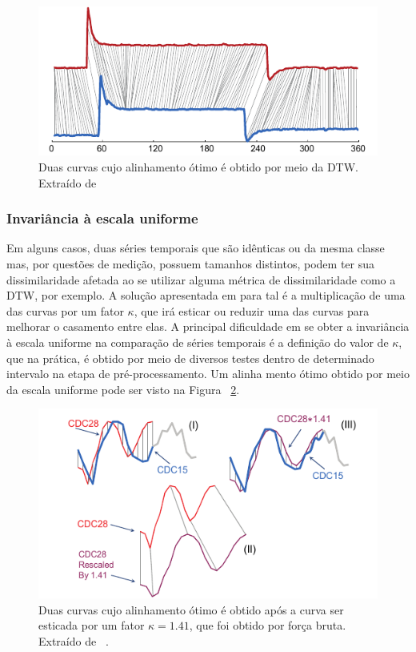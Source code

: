 \begin{figure}[h!]
	\includegraphics[width=\linewidth]{figuras/invariancias/deslocamento.png}
	\caption{Duas curvas cujo alinhamento ótimo é obtido por meio da DTW. Extraído de ~\parencite{CID}}
	\label{fig:inv_deslocamento}
\end{figure}


\subsubsection{Invariância à escala uniforme}

Em alguns casos, duas séries temporais que são idênticas ou da mesma classe mas, por questões de medição, possuem tamanhos distintos, podem ter sua dissimilaridade afetada ao se utilizar alguma métrica de dissimilaridade como a DTW, por exemplo. A solução apresentada em \parencite{CID} para tal é a multiplicação de uma das curvas por um fator $\kappa$, que irá esticar ou reduzir uma das curvas para melhorar o casamento entre elas. A principal dificuldade em se obter a invariância à escala uniforme na comparação de séries temporais é a definição do valor de $\kappa$, que na prática, é obtido por meio de diversos testes dentro de determinado intervalo na etapa de pré-processamento. Um alinha mento ótimo obtido por meio da escala uniforme pode ser visto na Figura ~\ref{fig:inv_escala_uniforme}.

\begin{figure}[h!]
	\includegraphics[width=\linewidth]{figuras/invariancias/escala_uniforme.png}
	\caption{Duas curvas cujo alinhamento ótimo é obtido após a curva ser esticada por um fator $\kappa=1.41$, que foi obtido por força bruta. Extraído de ~\parencite{CID}.}
	\label{fig:inv_escala_uniforme}
\end{figure}


